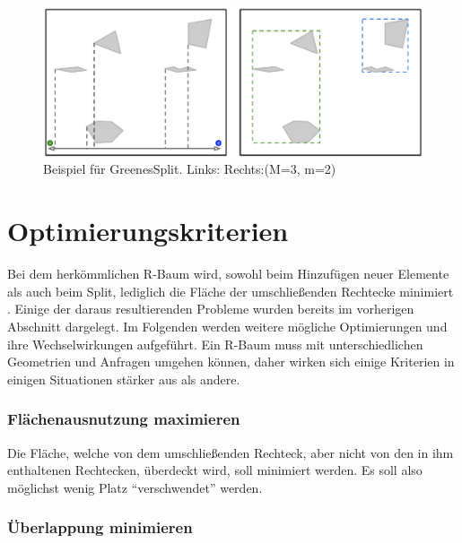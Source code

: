 \documentclass[runningheads,a4paper]{llncs}
\begin{document}
\begin{figure}[H]
		\begin{center}
		\includegraphics[width=1.0\textwidth ]{005_Beispiel_Greenes_Split.pdf}
		\caption{Beispiel für GreenesSplit. Links: Rechts:(\acs{M}=3, \acs{m}=2)}
		\label{fig:beispiel-greenes-split}
		\end{center}
	\end{figure} 


\section{Optimierungskriterien} %
\label{sec:optimierungskriterien}

	Bei dem herkömmlichen R-Baum wird, sowohl beim Hinzufügen neuer Elemente als auch beim Split, lediglich die Fläche der umschließenden Rechtecke minimiert \citep[vgl.][50-51]{Guttman:1984}. Einige der daraus resultierenden Probleme wurden bereits im vorherigen Abschnitt dargelegt.
	Im Folgenden werden weitere mögliche Optimierungen und ihre Wechselwirkungen aufgeführt. Ein R-Baum muss mit unterschiedlichen Geometrien und Anfragen umgehen können, daher wirken sich einige Kriterien in einigen Situationen stärker aus als andere.

	\subsubsection{Flächenausnutzung maximieren} %
	\label{ssub:flaechenausnutzung}

	Die Fläche, welche von dem umschließenden Rechteck, aber nicht von den in ihm enthaltenen Rechtecken, überdeckt wird, soll minimiert werden. Es soll also möglichst wenig Platz \enquote{verschwendet} werden. \citep[vgl.][323]{Beckmann:1990}


	\subsubsection{Überlappung minimieren} %
	\label{ssub:ueberlappung_minimieren}
\end{document}
